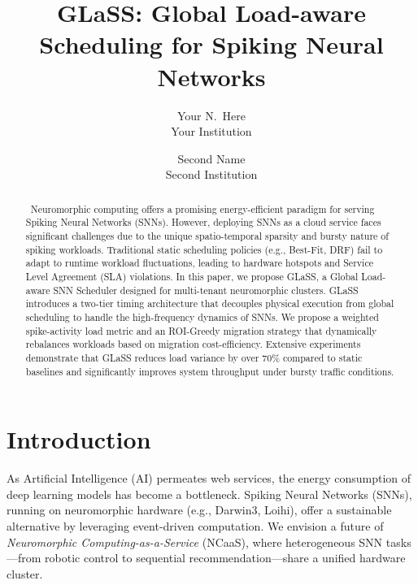 \documentclass[letterpaper,twocolumn,10pt]{article}
\begin{document}

\date{}

\title{\Large \bf GLaSS: Global Load-aware Scheduling for Spiking Neural Networks}

\author{
{\rm Your N.\ Here}\\
Your Institution
\and
{\rm Second Name}\\
Second Institution
} %

\maketitle

\begin{abstract}
~\cite{288610}Neuromorphic computing offers a promising energy-efficient paradigm for serving Spiking Neural Networks (SNNs). However, deploying SNNs as a cloud service faces significant challenges due to the unique spatio-temporal sparsity and bursty nature of spiking workloads. Traditional static scheduling policies (e.g., Best-Fit, DRF) fail to adapt to runtime workload fluctuations, leading to hardware hotspots and Service Level Agreement (SLA) violations. In this paper, we propose GLaSS, a Global Load-aware SNN Scheduler designed for multi-tenant neuromorphic clusters. GLaSS introduces a two-tier timing architecture that decouples physical execution from global scheduling to handle the high-frequency dynamics of SNNs. We propose a weighted spike-activity load metric and an ROI-Greedy migration strategy that dynamically rebalances workloads based on migration cost-efficiency. Extensive experiments demonstrate that GLaSS reduces load variance by over 70\% compared to static baselines and significantly improves system throughput under bursty traffic conditions.
\end{abstract}

\section{Introduction}
As Artificial Intelligence (AI) permeates web services, the energy consumption of deep learning models has become a bottleneck. Spiking Neural Networks (SNNs), running on neuromorphic hardware (e.g., Darwin3, Loihi), offer a sustainable alternative by leveraging event-driven computation. We envision a future of \textit{Neuromorphic Computing-as-a-Service} (NCaaS), where heterogeneous SNN tasks---from robotic control to sequential recommendation---share a unified hardware cluster.
\end{document}
